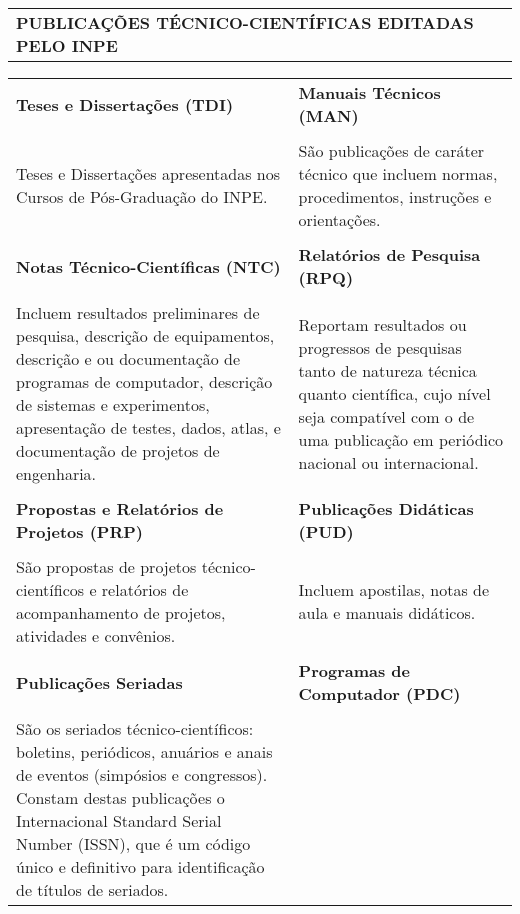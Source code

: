 \thispagestyle{empty}
 \begin{table}
  \begin{center}
  \begin{tabularx}{\textwidth}{X}
   \textbf{PUBLICAÇÕES TÉCNICO-CIENTÍFICAS EDITADAS PELO INPE}
  \end{tabularx} 
  \end{center}
 \end{table}
  
 \begin{table}
  \begin{center}
  \begin{tabularx}{\textwidth}{X X}
      
  \textbf{Teses e Dissertações (TDI)}              & \textbf{Manuais Técnicos (MAN)}\\
\\
Teses e Dissertações apresentadas nos Cursos de Pós-Graduação do INPE.	&
São publicações de caráter técnico que incluem normas, procedimentos, instruções e orientações.\\
\\
\textbf{Notas Técnico-Científicas (NTC)}           & \textbf{Relatórios de Pesquisa (RPQ)}\\
\\
Incluem resultados preliminares de pesquisa, descrição de equipamentos, descrição e ou documentação de programas de computador, descrição de sistemas e experimentos, apresentação de testes, dados, atlas, e documentação de projetos de engenharia. 
&	
Reportam resultados ou progressos de pesquisas tanto de natureza técnica quanto científica, cujo nível seja compatível com o de uma publicação em periódico nacional ou internacional.\\
\\
\textbf{Propostas e Relatórios de Projetos (PRP)}	& \textbf{Publicações Didáticas (PUD)} 
\\
\\
São propostas de projetos técnico-científicos e relatórios de acompanhamento de projetos, atividades e convênios.
&	
Incluem apostilas, notas de aula e manuais didáticos. \\
\\         
\textbf{Publicações Seriadas} 	& \textbf{Programas de Computador (PDC)}\\
\\
São os seriados técnico-científicos: boletins, periódicos, anuários e anais de eventos (simpósios e congressos). Constam destas publicações o Internacional Standard Serial Number (ISSN), que é um código único e definitivo para identificação de títulos de seriados. 

\end{tabularx}
\end{center}
\end{table}
